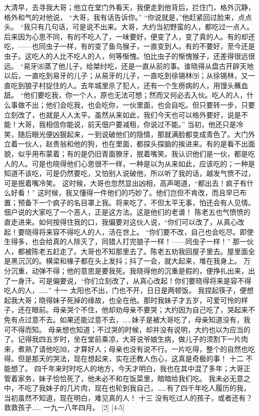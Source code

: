\documentclass[12pt,UTF8]{ctexbook}
\begin{document}
大清早，去寻我大哥；他立在堂门外看天，我便走到他背后，拦住门，格外沉静，格外和气的对他说，
“大哥，我有话告诉你。”
“你说就是，”他赶紧回过脸来，点点头。
“我只有几句话，可是说不出来。大哥，大约当初野蛮的人，都吃过一点人。后来因为心思不同，有的不吃人了，一味要好，便变了人，变了真的人。有的却还吃，——也同虫子一样，有的变了鱼鸟猴子，一直变到人。有的不要好，至今还是虫子。这吃人的人比不吃人的人，何等惭愧。怕比虫子的惭愧猴子，还差得很远很远。
“易牙⑻蒸了他儿子，给桀纣吃，还是一直从前的事。谁晓得从盘古开辟天地以后，一直吃到易牙的儿子；从易牙的儿子，一直吃到徐锡林⑼；从徐锡林，又一直吃到狼子村捉住的人。去年城里杀了犯人，还有一个生痨病的人，用馒头蘸血舐。
“他们要吃我，你一个人，原也无法可想；然而又何必去入伙。吃人的人，什么事做不出；他们会吃我，也会吃你，一伙里面，也会自吃。但只要转一步，只要立刻改了，也就是人人太平。虽然从来如此，我们今天也可以格外要好，说是不能！大哥，我相信你能说，前天佃户要减租，你说过不能。”
当初，他还只是冷笑，随后眼光便凶狠起来，一到说破他们的隐情，那就满脸都变成青色了。大门外立着一伙人，赵贵翁和他的狗，也在里面，都探头探脑的挨进来。有的是看不出面貌，似乎用布蒙着；有的是仍旧青面獠牙，抿着嘴笑。我认识他们是一伙，都是吃人的人。可是也晓得他们心思很不一样，一种是以为从来如此，应该吃的；一种是知道不该吃，可是仍然要吃，又怕别人说破他，所以听了我的话，越发气愤不过，可是抿着嘴冷笑。
这时候，大哥也忽然显出凶相，高声喝道，“都出去！疯子有什么好看！”
这时候，我又懂得一件他们的巧妙了。他们岂但不肯改，而且早已布置；预备下一个疯子的名目罩上我。将来吃了，不但太平无事，怕还会有人见情。佃户说的大家吃了一个恶人，正是这方法。这是他们的老谱！
陈老五也气愤愤的直走进来。如何按得住我的口，我偏要对这伙人说，“你们可以改了，从真心改起！要晓得将来容不得吃人的人，活在世上。
“你们要不改，自己也会吃尽。即使生得多，也会给真的人除灭了，同猎人打完狼子一样！——同虫子一样！”
那一伙人，都被陈老五赶走了。大哥也不知那里去了。陈老五劝我回屋子里去。屋里面全是黑沉沉的。横梁和椽子都在头上发抖；抖了一会，就大起来，堆在我身上。
万分沉重，动弹不得；他的意思是要我死。我晓得他的沉重是假的，便挣扎出来，出了一身汗。可是偏要说，“你们立刻改了，从真心改起！你们要晓得将来是容不得吃人的人，……”
十一
太阳也不出，门也不开，日日是两顿饭。
我捏起筷子，便想起我大哥；晓得妹子死掉的缘故，也全在他。那时我妹子才五岁，可爱可怜的样子，还在眼前。母亲哭个不住，他却劝母亲不要哭；大约因为自己吃了，哭起来不免有点过意不去。如果还能过意不去，……妹子是被大哥吃了，母亲知道没有，我可不得而知。
母亲想也知道；不过哭的时候，却并没有说明，大约也以为应当的了。记得我四五岁时，坐在堂前乘凉，大哥说爷娘生病，做儿子的须割下一片肉来，煮熟了请他吃⑽，才算好人；母亲也没有说不行。一片吃得，整个的自然也吃得。但是那天的哭法，现在想起来，实在还教人伤心，这真是奇极的事！
十二
不能想了。
四千年来时时吃人的地方，今天才明白，我也在其中混了多年；大哥正管着家务，妹子恰恰死了，他未必不和在饭菜里，暗暗给我们吃。
我未必无意之中，不吃了我妹子的几片肉，现在也轮到我自己，……有了四千年吃人履历的我，当初虽然不知道，现在明白，难见真的人！
十三
没有吃过人的孩子，或者还有？
救救孩子……
一九一八年四月。 [2] [4-5]
\backmatter
\end{document}
